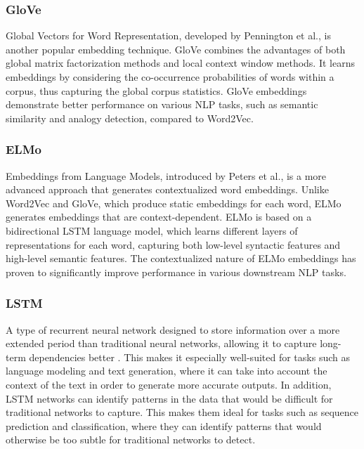 \subsubsection{\ac{GloVe}}

Global Vectors for Word Representation, developed by Pennington et al.\cite{pennington-etal-2014-glove}, is another popular embedding technique. GloVe combines the advantages of both global matrix factorization methods and local context window methods. It learns embeddings by considering the co-occurrence probabilities of words within a corpus, thus capturing the global corpus statistics. GloVe embeddings demonstrate better performance on various NLP tasks, such as semantic similarity and analogy detection, compared to Word2Vec.

\subsubsection{\ac{ELMo}}

Embeddings from Language Models, introduced by Peters et al.\cite{ELMo}, is a more advanced approach that generates contextualized word embeddings. Unlike Word2Vec and GloVe, which produce static embeddings for each word, ELMo generates embeddings that are context-dependent. ELMo is based on a bidirectional LSTM language model, which learns different layers of representations for each word, capturing both low-level syntactic features and high-level semantic features. The contextualized nature of ELMo embeddings has proven to significantly improve performance in various downstream NLP tasks.

\subsubsection{\ac{LSTM}}

A type of recurrent neural network designed to store information over a more extended period than traditional neural networks, allowing it to capture long-term dependencies better \cite{Hochreiter1997LongSM}.
This makes it especially well-suited for tasks such as language modeling and text generation, where it can take into account the context of the text in order to generate more accurate outputs.
In addition, LSTM networks can identify patterns in the data that would be difficult for traditional networks to capture. This makes them ideal for tasks such as sequence prediction and classification, where they can identify patterns that would otherwise be too subtle for traditional networks to detect.

